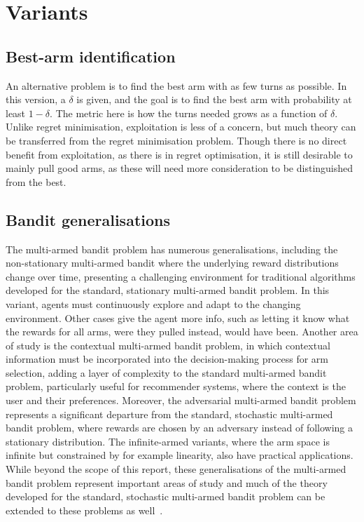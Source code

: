 \section{Variants}
\subsection{Best-arm identification}
An alternative problem is to find the best arm with as few turns as possible.
In this version, a $\delta$ is given, and the goal is to find the best arm with probability at least $1-\delta$.
The metric here is how the turns needed grows as a function of $\delta$.
Unlike regret minimisation, exploitation is less of a concern, but much theory can be transferred from the regret minimisation problem.
Though there is no direct benefit from exploitation, as there is in regret optimisation, it is still desirable to mainly pull good arms, as these will need more consideration to be distinguished from the best.

\subsection{Bandit generalisations}
The multi-armed bandit problem has numerous generalisations, including the non-stationary multi-armed bandit where the underlying reward distributions change over time, presenting a challenging environment for traditional algorithms developed for the standard, stationary multi-armed bandit problem.
In this variant, agents must continuously explore and adapt to the changing environment.
Other cases give the agent more info, such as letting it know what the rewards for all arms, were they pulled instead, would have been.
Another area of study is the contextual multi-armed bandit problem, in which contextual information must be incorporated into the decision-making process for arm selection, adding a layer of complexity to the standard multi-armed bandit problem, particularly useful for recommender systems, where the context is the user and their preferences.
Moreover, the adversarial multi-armed bandit problem represents a significant departure from the standard, stochastic multi-armed bandit problem, where rewards are chosen by an adversary instead of following a stationary distribution.
The infinite-armed variants, where the arm space is infinite but constrained by for example linearity, also have practical applications.
While beyond the scope of this report, these generalisations of the multi-armed bandit problem represent important areas of study and much of the theory developed for the standard, stochastic multi-armed bandit problem can be extended to these problems as well~\autocite{slivkins2019,lattimore2020}.


